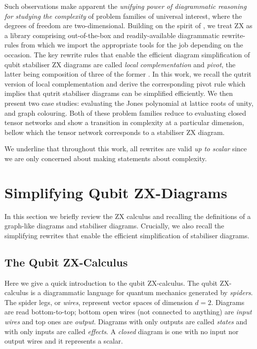 \documentclass[submission,copyright,creativecommons]{eptcs}
\begin{document}
Such observations make apparent the \emph{unifying power of diagrammatic reasoning
for studying the complexity} of problem families of universal interest,
where the degrees of freedom are two-dimensional.
Building on the spirit of \cite{debeaudrap2020tensor}, we treat ZX as a library comprising out-of-the-box and readily-available diagrammatic rewrite-rules from which we import the appropriate tools for the job depending on the occasion.
The key rewrite rules that enable the efficient diagram simplification
of qubit stabiliser ZX diagrams
are called \emph{local complementation} and \emph{pivot},
the latter being composition of three of the former \cite{graph_theoretic_simplification}.
In this work, we recall the qutrit version of local complementation and derive the corresponding pivot rule
which implies that qutrit stabiliser diagrams can be simplified efficiently.
We then present two case studies: evaluating the Jones polynomial at lattice roots of unity, and graph colouring.
Both of these problem families reduce to evaluating
closed tensor networks and show a transition in complexity
at a particular dimension, bellow which the tensor network corresponds to a stabiliser ZX diagram.

We underline that throughout this work, all rewrites are valid
\emph{up to scalar}
since we are only concerned about making statements about complexity.

%  

\section{Simplifying Qubit ZX-Diagrams}

In this section we briefly review the ZX calculus
and recalling the definitions of a graph-like diagrams and stabiliser diagrams.
Crucially, we also recall the simplifying rewrites that enable the efficient
simplification of stabiliser diagrams.

\subsection{The Qubit ZX-Calculus}

Here we give a quick introduction to the qubit ZX-calculus.
The qubit ZX-calculus is a diagrammatic language for quantum mechanics generated by \textit{spiders}.
The spider legs, or \emph{wires}, represent vector spaces of dimension $d=2$.
Diagrams are read bottom-to-top; bottom open wires (not connected to anything) are \emph{input wires} and top ones are \emph{output}.
Diagrams with only outputs are called \emph{states} and with only inputs are called \emph{effects}.
A \emph{closed} diagram is one with no input nor output wires
and it represents a scalar.
\end{document}
